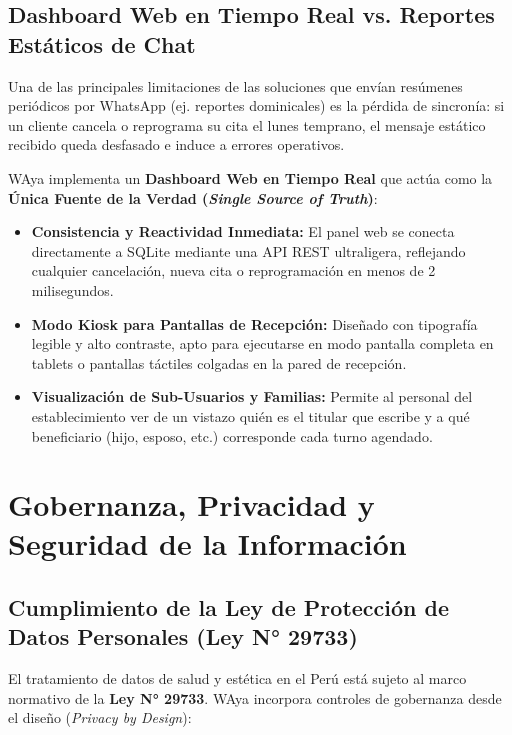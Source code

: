 \documentclass[12pt,a4paper]{report}
\begin{document}
\section{Dashboard Web en Tiempo Real vs. Reportes Estáticos de Chat}
Una de las principales limitaciones de las soluciones que envían resúmenes periódicos por WhatsApp (ej. reportes dominicales) es la pérdida de sincronía: si un cliente cancela o reprograma su cita el lunes temprano, el mensaje estático recibido queda desfasado e induce a errores operativos.

WAya implementa un \textbf{Dashboard Web en Tiempo Real} que actúa como la \textbf{Única Fuente de la Verdad (\textit{Single Source of Truth})}:
\begin{itemize}[leftmargin=1.5em]
    \item \textbf{Consistencia y Reactividad Inmediata:} El panel web se conecta directamente a SQLite mediante una API REST ultraligera, reflejando cualquier cancelación, nueva cita o reprogramación en menos de 2 milisegundos.
    \item \textbf{Modo Kiosk para Pantallas de Recepción:} Diseñado con tipografía legible y alto contraste, apto para ejecutarse en modo pantalla completa en tablets o pantallas táctiles colgadas en la pared de recepción.
    \item \textbf{Visualización de Sub-Usuarios y Familias:} Permite al personal del establecimiento ver de un vistazo quién es el titular que escribe y a qué beneficiario (hijo, esposo, etc.) corresponde cada turno agendado.
\end{itemize}

\chapter{Gobernanza, Privacidad y Seguridad de la Información}

\section{Cumplimiento de la Ley de Protección de Datos Personales (Ley N° 29733)}
El tratamiento de datos de salud y estética en el Perú está sujeto al marco normativo de la \textbf{Ley N° 29733}. WAya incorpora controles de gobernanza desde el diseño (\textit{Privacy by Design}):
\end{document}
